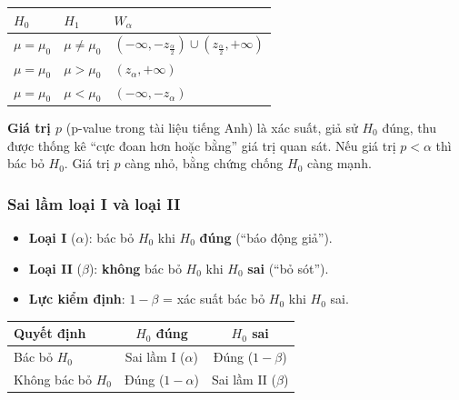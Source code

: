 \documentclass[12pt,a4paper]{article}
\begin{document}
\begin{congthuc}[title={Miền bác bỏ theo dạng $H_1$}]
  \begin{center}
  \begin{tabular}{lll}
    \toprule
    $H_0$ & $H_1$ & $W_\alpha$ \\
    \midrule
    $\mu = \mu_0$ & $\mu \ne \mu_0$ & $(-\infty, -z_{\frac{\alpha}{2}}) \cup (z_{\frac{\alpha}{2}}, +\infty)$ \\
    $\mu = \mu_0$ & $\mu > \mu_0$ & $(z_\alpha, +\infty)$ \\
    $\mu = \mu_0$ & $\mu < \mu_0$ & $(-\infty, -z_\alpha)$ \\
    \bottomrule
  \end{tabular}
  \end{center}
\end{congthuc}

\begin{ynghia}[title={Giá trị $p$}]
\textbf{Giá trị $p$} (p-value trong tài liệu tiếng Anh) là xác suất, giả sử $H_0$ đúng, thu được thống kê ``cực đoan hơn hoặc bằng'' giá trị quan sát. Nếu giá trị $p < \alpha$ thì bác bỏ $H_0$. Giá trị $p$ càng nhỏ, bằng chứng chống $H_0$ càng mạnh.
\end{ynghia}

\subsubsection{Sai lầm loại I và loại II}

\begin{dinhnghia}[title={Sai lầm kiểm định}]
\begin{itemize}
  \item \textbf{Loại I} ($\alpha$): bác bỏ $H_0$ khi $H_0$ \textbf{đúng} (``báo động giả'').
  \item \textbf{Loại II} ($\beta$): \textbf{không} bác bỏ $H_0$ khi $H_0$ \textbf{sai} (``bỏ sót'').
  \item \textbf{Lực kiểm định}: $1 - \beta$ = xác suất bác bỏ $H_0$ khi $H_0$ sai.
\end{itemize}
\end{dinhnghia}

\begin{congthuc}[title={Bảng quyết định}]
  \begin{center}
  \begin{tabular}{lcc}
    \toprule
    Quyết định & $H_0$ đúng & $H_0$ sai \\
    \midrule
    Bác bỏ $H_0$ & Sai lầm I ($\alpha$) & Đúng ($1-\beta$) \\
    Không bác bỏ $H_0$ & Đúng ($1-\alpha$) & Sai lầm II ($\beta$) \\
    \bottomrule
  \end{tabular}
  \end{center}
\end{congthuc}
\end{document}
